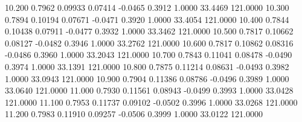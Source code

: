   10.200   0.7962   0.09933   0.07414  -0.0465   0.3912   1.0000  33.4469 121.0000
  10.300   0.7894   0.10194   0.07671  -0.0471   0.3920   1.0000  33.4054 121.0000
  10.400   0.7844   0.10438   0.07911  -0.0477   0.3932   1.0000  33.3462 121.0000
  10.500   0.7817   0.10662   0.08127  -0.0482   0.3946   1.0000  33.2762 121.0000
  10.600   0.7817   0.10862   0.08316  -0.0486   0.3960   1.0000  33.2043 121.0000
  10.700   0.7843   0.11041   0.08478  -0.0490   0.3974   1.0000  33.1391 121.0000
  10.800   0.7875   0.11214   0.08631  -0.0493   0.3982   1.0000  33.0943 121.0000
  10.900   0.7904   0.11386   0.08786  -0.0496   0.3989   1.0000  33.0640 121.0000
  11.000   0.7930   0.11561   0.08943  -0.0499   0.3993   1.0000  33.0428 121.0000
  11.100   0.7953   0.11737   0.09102  -0.0502   0.3996   1.0000  33.0268 121.0000
  11.200   0.7983   0.11910   0.09257  -0.0506   0.3999   1.0000  33.0122 121.0000
